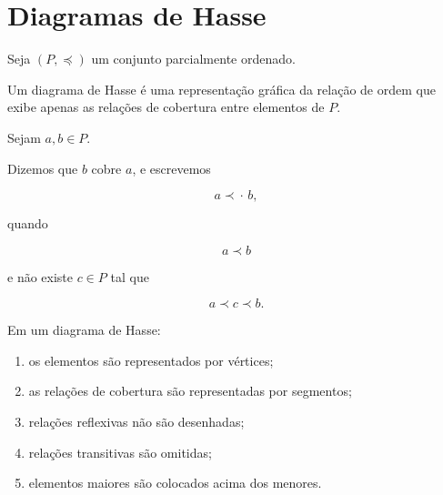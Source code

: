 \documentclass[../../main]{subfiles}
\begin{document}
\section{Diagramas de Hasse}
\label{sec:matematica:relacoes:diagramas-de-hasse}

\begin{defn}
	\label{def:matematica:relacoes:diagramas-de-hasse:diagrama-de-hasse}

	Seja \((P,\preceq)\) um conjunto parcialmente ordenado.

	Um diagrama de Hasse é uma representação gráfica da relação de ordem
	que exibe apenas as relações de cobertura entre elementos de \(P\).

\end{defn}

\begin{defn}
	\label{def:matematica:relacoes:diagramas-de-hasse:cobertura}

	Sejam \(a,b\in P\).

	Dizemos que \(b\) cobre \(a\), e escrevemos

	\[
		a \prec\!\!\cdot\, b,
	\]

	quando

	\[
		a \prec b
	\]

	e não existe \(c\in P\) tal que

	\[
		a \prec c \prec b.
	\]

\end{defn}

\begin{obs}

	Em um diagrama de Hasse:

	\begin{enumerate}
		\item os elementos são representados por vértices;

		\item as relações de cobertura são representadas por segmentos;

		\item relações reflexivas não são desenhadas;

		\item relações transitivas são omitidas;

		\item elementos maiores são colocados acima dos menores.
	\end{enumerate}

\end{obs}
\end{document}
